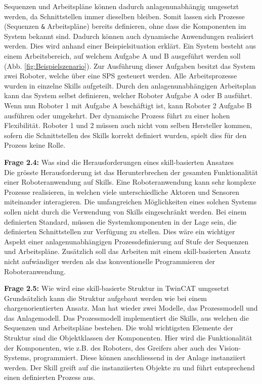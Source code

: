 		Sequenzen und Arbeitspläne können dadurch anlagenunabhängig umgesetzt werden, da Schnittstellen immer dieselben bleiben. Somit lassen sich Prozesse (Sequenzen \verb|&| Arbeitspläne) bereits definieren, ohne dass die Komponenten im System bekannt sind. Dadurch können auch dynamische Anwendungen realisiert werden. Dies wird anhand einer Beispielsituation erklärt. Ein System besteht aus einem Arbeitsbereich, auf welchem Aufgabe A und B ausgeführt werden soll (Abb. \ref{fig:Beispielszenario}).  
		Zur Ausführung dieser Aufgaben besitzt das System zwei Roboter, welche über eine \Gls{SPS} gesteuert werden. Alle Arbeitsprozesse wurden in einzelne Skills aufgeteilt. Durch den anlagenunabhängigen Arbeitsplan kann das System selbst definieren, welcher Roboter Aufgabe A oder B ausführt. Wenn nun Roboter 1 mit Aufgabe A beschäftigt ist, kann Roboter 2 Aufgabe B ausführen oder umgekehrt. Der dynamische Prozess führt zu einer hohen Flexibilität. Roboter 1 und 2 müssen auch nicht vom selben Hersteller kommen, sofern die Schnittstellen des Skills korrekt definiert wurden, spielt dies für den Prozess keine Rolle. 
	
	\vspace{3mm}
	
	\textbf{Frage 2.4:} Was sind die Herausforderungen eines skill-basierten Ansatzes \vspace{2mm} 
	\\
		Die grösste Herausforderung ist das Herunterbrechen der gesamten Funktionalität einer Roboteranwendung auf Skills. Eine Roboteranwendung kann sehr komplexe Prozesse realisieren, in welchen viele unterschiedliche Aktoren und Sensoren miteinander interagieren. Die umfangreichen Möglichkeiten eines solchen Systems sollen nicht durch die Verwendung von Skills eingeschränkt werden. Bei einem definierten Standard, müssen die Systemkomponenten in der Lage sein, die definierten Schnittstellen zur Verfügung zu stellen. Dies wäre ein wichtiger Aspekt einer anlagenunabhängigen Prozessdefinierung auf Stufe der Sequenzen und Arbeitspläne. Zusätzlich soll das Arbeiten mit einem skill-basierten Ansatz nicht aufwändiger werden als das konventionelle Programmieren der Roboteranwendung. 
	\vspace{3mm}
	
	\textbf{Frage 2.5:} Wie wird eine skill-basierte Struktur in TwinCAT umgesetzt \vspace{2mm} 
	\\
		Grundsätzlich kann die Struktur aufgebaut werden wie bei einem chargenorientierten Ansatz. Man hat wieder zwei Modelle, das Prozessmodell und das Anlagemodell. Das Prozessmodell implementiert die Skills, aus welchen die Sequenzen und Arbeitspläne bestehen. Die wohl wichtigsten Elemente der Struktur sind die Objektklassen der Komponenten. Hier wird die Funktionalität der Komponenten, wie z.B. des Roboters, des Greifers aber auch des Vision-Systems, programmiert. Diese können anschliessend in der Anlage instanziiert werden. Der Skill greift auf die instanziierten Objekte zu und führt entsprechend einen definierten Prozess aus. 
	
